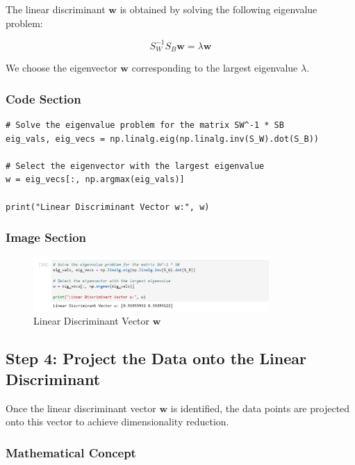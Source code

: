 \documentclass{exam}
\begin{document}
The linear discriminant \( \mathbf{w} \) is obtained by solving the following eigenvalue problem:

\[
S_W^{-1} S_B \mathbf{w} = \lambda \mathbf{w}
\]

We choose the eigenvector \( \mathbf{w} \) corresponding to the largest eigenvalue \( \lambda \).

\subsubsection*{Code Section}

\begin{verbatim}
# Solve the eigenvalue problem for the matrix SW^-1 * SB
eig_vals, eig_vecs = np.linalg.eig(np.linalg.inv(S_W).dot(S_B))

# Select the eigenvector with the largest eigenvalue
w = eig_vecs[:, np.argmax(eig_vals)]

print("Linear Discriminant Vector w:", w)
\end{verbatim}

\subsubsection*{Image Section}

\begin{figure}[h!]
    \centering
    \includegraphics[width=0.8\textwidth]{images/lda_vector.png}
    \caption{Linear Discriminant Vector \( \mathbf{w} \)}
    \label{fig:lda_vector}
\end{figure}

\newpage

\subsection{Step 4: Project the Data onto the Linear Discriminant}

Once the linear discriminant vector \( \mathbf{w} \) is identified, the data points are projected onto this vector to achieve dimensionality reduction.

\subsubsection*{Mathematical Concept}
\end{document}
